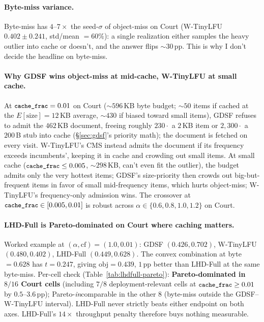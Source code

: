 \documentclass[letterpaper,twocolumn,10pt]{article}
\newcommand{\code}[1]{\texttt{\small #1}}
\begin{document}
\paragraph{Byte-miss variance.} Byte-miss has $4$--$7\times$ the
seed-$\sigma$ of object-miss on Court (W-TinyLFU $0.402 \pm 0.241$,
std/mean $= 60\%$): a single realization either samples the heavy
outlier into cache or doesn't, and the answer flips $\sim 30$\,pp.
This is why I don't decide the headline on byte-miss.

\paragraph{Why GDSF wins object-miss at mid-cache, W-TinyLFU at small
cache.} At $\code{cache\_frac} = 0.01$ on Court ($\sim 596$\,KB byte
budget; $\sim 50$ items if cached at the $E[\text{size}]=12$\,KB
average, $\sim 430$ if biased toward small items), GDSF refuses to
admit the $462$\,KB document, freeing roughly $230 \cdot$ a $2$\,KB
item or $2{,}300 \cdot$ a $200$\,B stub into cache
(\S\ref{sec:gdsf}'s priority math); the document is fetched on every
visit. W-TinyLFU's CMS instead admits the document if its frequency
exceeds incumbents', keeping it in cache and crowding out small
items. At small cache ($\code{cache\_frac} \leq 0.005$, $\sim
298$\,KB, can't even fit the outlier), the budget admits only the
very hottest items; GDSF's size-priority then crowds out
big-but-frequent items in favor of small mid-frequency items, which
hurts object-miss; W-TinyLFU's frequency-only admission wins. The
crossover at $\code{cache\_frac} \in [0.005, 0.01]$ is robust across
$\alpha \in \{0.6, 0.8, 1.0, 1.2\}$ on Court.

\paragraph{LHD-Full is Pareto-dominated on Court where caching matters.}
Worked example at $(\alpha, \text{cf}) = (1.0, 0.01)$: GDSF $(0.426,
0.702)$, W-TinyLFU $(0.480, 0.402)$, LHD-Full $(0.449, 0.628)$. The
convex combination at byte $= 0.628$ has $t = 0.247$, giving
$\text{obj} = 0.439$, $1$\,pp better than LHD-Full at the same
byte-miss. Per-cell check (Table~\ref{tab:lhdfull-pareto}):
\textbf{Pareto-dominated in $8/16$ Court cells} (including $7/8$
deployment-relevant cells at $\code{cache\_frac} \geq 0.01$ by
$0.5$--$3.6$\,pp); Pareto-\emph{in}comparable in the other 8
(byte-miss outside the GDSF--W-TinyLFU interval). LHD-Full never
strictly beats either endpoint on both axes. LHD-Full's
$14\times$ throughput penalty therefore buys nothing measurable.
\end{document}
